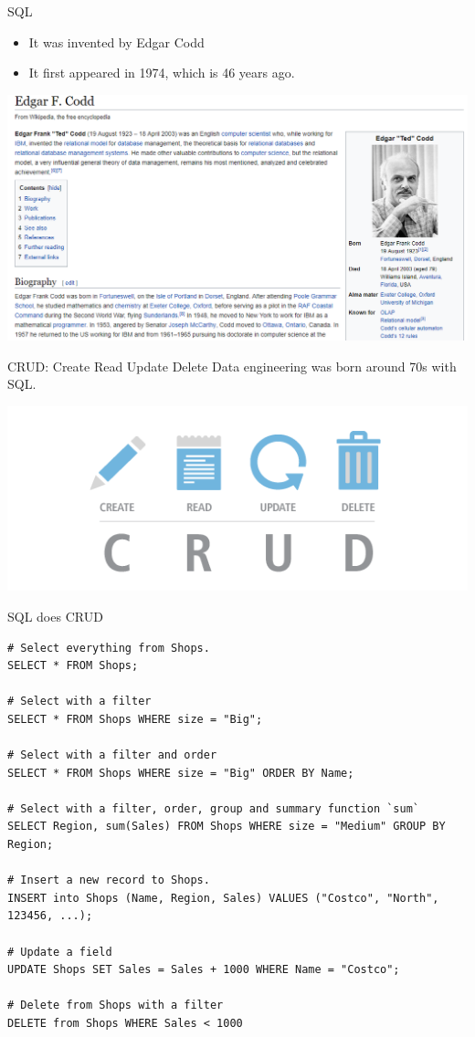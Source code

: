 \documentclass[
  10pt,
  ignorenonframetext,
  serif]{beamer}
\providecommand{\tightlist}{%
  \setlength{\itemsep}{0pt}\setlength{\parskip}{0pt}}
\begin{document}
\begin{frame}{SQL}
\protect\hypertarget{sql}{}
\begin{itemize}
\tightlist
\item
  It was invented by Edgar Codd
\item
  It first appeared in 1974, which is 46 years ago.
\end{itemize}

\begin{center}\includegraphics[width=0.6\linewidth]{imgs/2017/edgar-codd} \end{center}
\end{frame}

\begin{frame}{CRUD: Create \textbar{} Read \textbar{} Update \textbar{}
Delete}
\protect\hypertarget{crud-create-read-update-delete}{}
Data engineering was born around 70s with SQL.

\begin{center}\includegraphics[width=0.45\linewidth]{imgs/2017/CRUD} \end{center}
\end{frame}

\begin{frame}[fragile]{SQL does CRUD}
\protect\hypertarget{sql-does-crud}{}
\begin{verbatim}
# Select everything from Shops.
SELECT * FROM Shops;

# Select with a filter
SELECT * FROM Shops WHERE size = "Big";

# Select with a filter and order
SELECT * FROM Shops WHERE size = "Big" ORDER BY Name;

# Select with a filter, order, group and summary function `sum`
SELECT Region, sum(Sales) FROM Shops WHERE size = "Medium" GROUP BY Region;

# Insert a new record to Shops.
INSERT into Shops (Name, Region, Sales) VALUES ("Costco", "North", 123456, ...);

# Update a field
UPDATE Shops SET Sales = Sales + 1000 WHERE Name = "Costco";

# Delete from Shops with a filter
DELETE from Shops WHERE Sales < 1000
\end{verbatim}
\end{frame}
\end{document}

